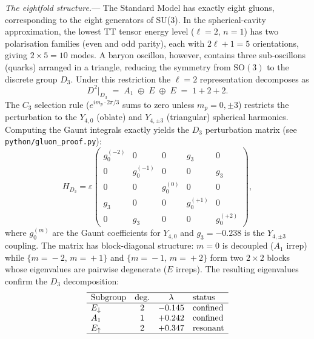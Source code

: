 \documentclass[11pt]{article}
\begin{document}
\textit{The eightfold structure.}---
The Standard Model has exactly eight gluons,
corresponding to the eight generators of SU(3).
In the spherical-cavity approximation, the lowest
TT tensor energy level ($\ell = 2$, $n = 1$) has
two polarisation families (even and odd parity),
each with $2\ell+1 = 5$ orientations, giving
$2 \times 5 = 10$ modes.  A baryon oscillon,
however, contains three sub-oscillons (quarks)
arranged in a triangle, reducing the symmetry from
$\mathrm{SO}(3)$ to the discrete group $D_3$.
Under this restriction the $\ell = 2$
representation decomposes as
\begin{equation}\label{eq:D3_decomp}
  D^{2}\big|_{D_3}
  \;=\; A_1 \;\oplus\; E \;\oplus\; E
  \;=\; 1 + 2 + 2.
\end{equation}
The $C_3$ selection rule
($e^{im_p \cdot 2\pi/3}$ sums to zero unless
$m_p = 0, \pm 3$) restricts the perturbation to
the $Y_{4,0}$ (oblate) and $Y_{4,\pm 3}$
(triangular) spherical harmonics.  Computing the
Gaunt integrals exactly yields the $D_3$
perturbation matrix
(see \texttt{python/gluon\_proof.py}):
\begin{equation}\label{eq:D3_matrix}
  H_{D_3} = \varepsilon\!
  \begin{pmatrix}
    g_0^{(-2)} & 0 & 0 & g_3 & 0 \\
    0 & g_0^{(-1)} & 0 & 0 & g_3 \\
    0 & 0 & g_0^{(0)} & 0 & 0 \\
    g_3 & 0 & 0 & g_0^{(+1)} & 0 \\
    0 & g_3 & 0 & 0 & g_0^{(+2)}
  \end{pmatrix}\!,
\end{equation}
where $g_0^{(m)}$ are the Gaunt coefficients for
$Y_{4,0}$ and $g_3 = -0.238$ is the $Y_{4,\pm 3}$
coupling.  The matrix has block-diagonal structure:
$m = 0$ is decoupled ($A_1$ irrep) while
$\{m\!=\!-2,\,m\!=\!+1\}$ and
$\{m\!=\!-1,\,m\!=\!+2\}$
form two $2\times 2$ blocks whose eigenvalues are
pairwise degenerate ($E$ irreps).  The resulting
eigenvalues confirm the $D_3$ decomposition:
\begin{equation}\label{eq:mode_split}
\begin{array}{lccl}
  \hline
  \text{Subgroup} & \text{deg.}
    & \lambda & \text{status} \\
  \hline
  E_{\downarrow} & 2 & -0.145 & \text{confined} \\
  A_1            & 1 & +0.242 & \text{confined} \\
  E_{\uparrow}   & 2 & +0.347 & \text{resonant} \\
  \hline
\end{array}
\end{equation}
\end{document}
